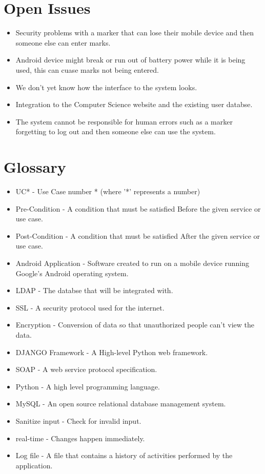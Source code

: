 \documentclass[a4paper]{article}
\begin{document}
	\section{Open Issues}
	
		\begin{itemize}
			\item Security problems with a marker that can lose their mobile device and then someone else can enter marks.
			\item Android device might break or run out of battery power while it is being used, this can cuase marks not being entered.
			\item We don't yet know how the interface to the system looks.
			\item Integration to the Computer Science website and the existing user databse.
			\item The system cannot be responsible for human errors such as a marker forgetting to log out and then someone else can use the system.
		\end{itemize}
	

	\section{Glossary}
		
		\begin{itemize}
			\item UC* - Use Case number * (where '*' represents a number)
			\item Pre-Condition - A condition that must be satisfied Before the given service or use case.
			\item Post-Condition - A condition that must be satisfied After the given service or use case.
			\item Android Application - Software created to run on a mobile device running Google's Android operating system.
			\item LDAP - The databse that will be integrated with.
			\item SSL - A security protocol used for the internet.
			\item Encryption - Conversion of data so that unauthorized people can't view the data.
			\item DJANGO Framework - A High-level Python web framework.
			\item SOAP - A web service protocol specification.
			\item Python - A high level programming language.
			\item MySQL - An open source relational database management system.
			\item Sanitize input - Check for invalid input.
			\item real-time - Changes happen immediately.
			\item Log file - A file that contains a history of activities performed by the application.
		
		\end{itemize}
\end{document}
